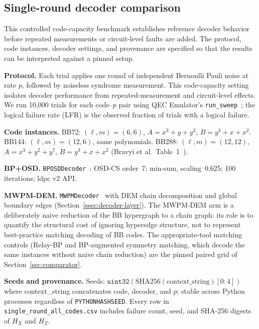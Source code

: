\documentclass[pdflatex,sn-mathphys-num]{sn-jnl}
\theoremstyle{thmstyleone}
\theoremstyle{thmstyletwo}
\theoremstyle{thmstylethree}
\begin{document}
\subsection{Single-round decoder comparison}
\label{sec:benchmark}

This controlled code-capacity benchmark establishes reference decoder behavior before repeated measurements or circuit-level faults are added. The protocol, code instances, decoder settings, and provenance are specified so that the results can be interpreted against a pinned setup.

\noindent\textbf{Protocol.} Each trial applies one round of independent Bernoulli Pauli noise at rate $p$, followed by noiseless syndrome measurement. This code-capacity setting isolates decoder performance from repeated-measurement and circuit-level effects. We run 10{,}000 trials for each code--$p$ pair using QEC Emulator's \texttt{run\_sweep}~\cite{AlDaajeh2026emulator}; the logical failure rate (LFR) is the observed fraction of trials with a logical failure.

\noindent\textbf{Code instances.} BB72: $(\ell,m)=(6,6)$, $A=x^3+y+y^2$, $B=y^3+x+x^2$. BB144: $(\ell,m)=(12,6)$, same polynomials. BB288: $(\ell,m)=(12,12)$, $A=x^3+y^2+y^7$, $B=y^3+x+x^2$ (Bravyi et al.\ Table~1~\cite{Bravyi2024}).

\noindent\textbf{BP+OSD.} \texttt{BPOSDDecoder}~\cite{AlDaajeh2026emulator,ldpcPackage}: OSD-CS order~7; min-sum, scaling~0.625; 100 iterations; ldpc v2 API.

\noindent\textbf{MWPM-DEM.} \texttt{MWPMDecoder}~\cite{AlDaajeh2026emulator,Higgott2023} with DEM chain decomposition and global boundary edges (Section~\ref{ssec:decoder-layer}). The MWPM-DEM arm is a deliberately naive reduction of the BB hypergraph to a chain graph: its role is to quantify the structural cost of ignoring hyperedge structure, not to represent best-practice matching decoding of BB codes. The appropriate-tool matching controls (Relay-BP and BP-augmented symmetry matching, which decode the same instances without naive chain reduction) are the pinned paired grid of Section~\ref{sec:comparator}.

\noindent\textbf{Seeds and provenance.} Seeds: $\texttt{uint32}(\mathrm{SHA256}(\mathrm{context\_string})[0{:}4])$ where context\_string concatenates code, decoder, and $p$; stable across Python processes regardless of \texttt{PYTHONHASHSEED}. Every row in \texttt{single\_round\_all\_codes.csv} includes failure count, seed, and SHA-256 digests of $H_X$ and $H_Z$.
\end{document}
